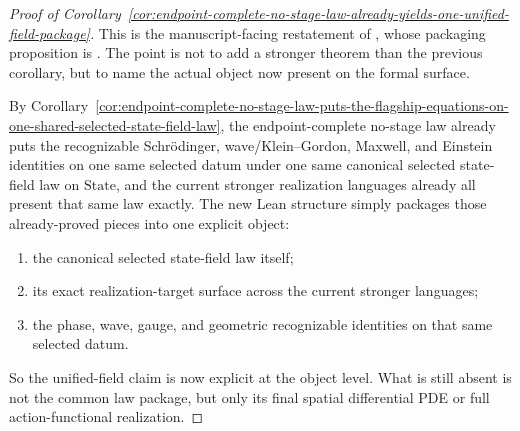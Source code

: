\begin{proof}[Proof of Corollary~\ref{cor:endpoint-complete-no-stage-law-already-yields-one-unified-field-package}]
\label{proof:cor:endpoint-complete-no-stage-law-already-yields-one-unified-field-package}
This is the manuscript-facing restatement of
,
whose packaging proposition is . The
point is not to add a stronger theorem than the previous corollary, but to
name the actual object now present on the formal surface.

By Corollary~\ref{cor:endpoint-complete-no-stage-law-puts-the-flagship-equations-on-one-shared-selected-state-field-law},
the endpoint-complete no-stage law already puts the recognizable
Schr\"odinger, wave/Klein--Gordon, Maxwell, and Einstein identities on one same
selected datum under one same canonical selected state-field law on
\(\mathrm{State}\), and the current stronger realization languages already all
present that same law exactly. The new Lean structure
 simply packages those already-proved pieces
into one explicit object:
\begin{enumerate}[label=(\roman*), leftmargin=2em, itemsep=0.2em]
\item the canonical selected state-field law itself;
\item its exact realization-target surface across the current stronger
      languages;
\item the phase, wave, gauge, and geometric recognizable identities on that
      same selected datum.
\end{enumerate}
So the unified-field claim is now explicit at the object level. What is still
absent is not the common law package, but only its final spatial differential
PDE or full action-functional realization.
\end{proof}

